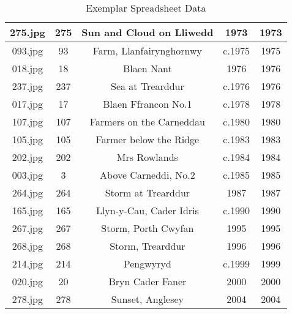 \begin{table}[h]
{\begin{tabular}{|c|c|c|c|c|}
275.jpg & 275 & Sun and Cloud on Lliwedd  & 1973 & 1973\\\hline
093.jpg & 93 & Farm, Llanfairynghornwy & c.1975 & 1975\\\hline
018.jpg & 18 & Blaen Nant & 1976 & 1976\\\hline
237.jpg & 237 & Sea at Trearddur & c.1976 & 1976\\\hline
017.jpg & 17 & Blaen Ffrancon No.1 & c.1978 & 1978\\\hline
107.jpg & 107 & Farmers on the Carneddau & c.1980 & 1980\\\hline
105.jpg & 105 & Farmer below the Ridge & c.1983 & 1983\\\hline
202.jpg & 202 & Mrs Rowlands & c.1984 & 1984\\\hline
003.jpg & 3 & Above Carneddi, No.2 & c.1985 & 1985\\\hline
264.jpg & 264 & Storm at Trearddur & 1987 & 1987\\\hline
165.jpg & 165 & Llyn-y-Cau, Cader Idris & c.1990 & 1990\\\hline
267.jpg & 267 & Storm, Porth Cwyfan & 1995 & 1995\\\hline
268.jpg & 268 & Storm, Trearddur & 1996 & 1996\\\hline
214.jpg & 214 & Pengwyryd & c.1999 & 1999\\\hline
020.jpg & 20 & Bryn Cader Faner & 2000 & 2000\\\hline
278.jpg & 278 & Sunset, Anglesey & 2004 & 2004\\\hline
\end{tabular}
}
\caption{Exemplar Spreadsheet Data}\label{tab:exemplar-spreadsheet}
\end{table}
